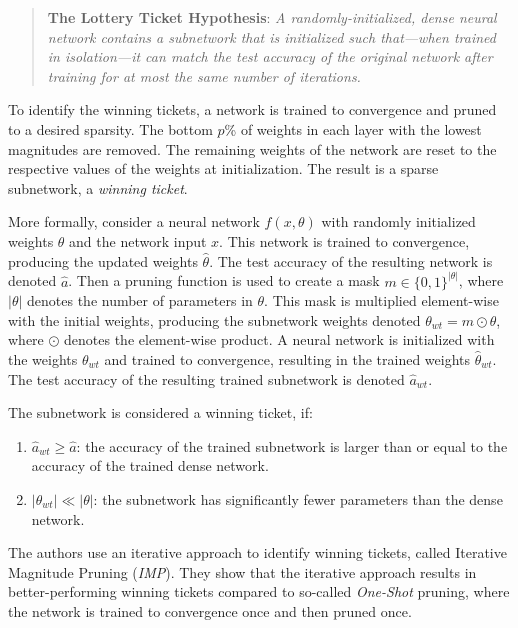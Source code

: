 \begin{quote}
\textbf{The Lottery Ticket Hypothesis}: \textit{A randomly-initialized, dense neural network contains a subnetwork that is initialized such that—when trained in isolation—it can match the test accuracy of the original network after training for at most the same number of iterations.}~\cite{LTH}
\end{quote}

To identify the winning tickets, a network is trained to convergence and pruned to a desired sparsity. 
The bottom $p$\% of weights in each layer with the lowest magnitudes are removed. 
The remaining weights of the network are reset to the respective values of the weights at initialization.
The result is a sparse subnetwork, a \textit{winning ticket}.

More formally, consider a neural network $f(x, \theta)$ with randomly initialized weights $\theta$ and the network input $x$.
This network is trained to convergence, producing the updated weights $\hat \theta$. The test accuracy of the resulting network is denoted $\hat a$.
Then a pruning function is used to create a mask $m \in {\{0,1\}}^{|\theta|}$, where $|\theta|$ denotes the number of parameters in $\theta$.
This mask is multiplied element-wise with the initial weights, producing the subnetwork weights denoted $\theta_{wt} = m \odot \theta$, where $\odot$ denotes the element-wise product.
A neural network is initialized with the weights $\theta_{wt}$ and trained to convergence, resulting in the trained weights $\hat \theta_{wt}$. 
The test accuracy of the resulting trained subnetwork is denoted $\hat a_{wt}$.

The subnetwork is considered a winning ticket, if:
\begin{enumerate}
  \item  $\hat a_{wt} \geq \hat a$:  the accuracy of the trained subnetwork is larger than or equal to the accuracy of the trained dense network.
  \item $|\theta_{wt}| \ll |\theta|$: the subnetwork has significantly fewer parameters than the dense network.
\end{enumerate}

The authors use an iterative approach to identify winning tickets, called Iterative Magnitude Pruning (\textit{IMP}).
They show that the iterative approach results in better-performing winning tickets compared to so-called \textit{One-Shot} pruning, where the network is trained to convergence once and then pruned once.


